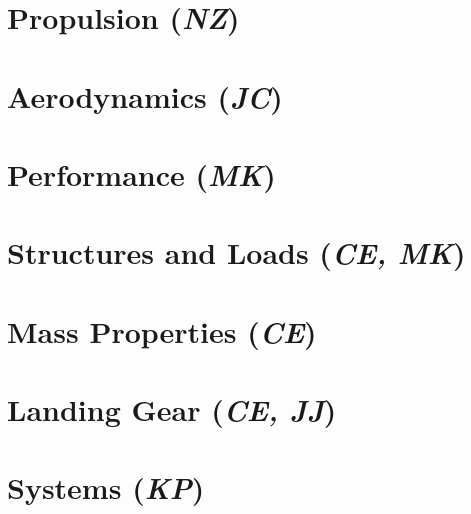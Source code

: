 \documentclass[conf]{new-aiaa}
\begin{document}
\clearpage
\section{Propulsion (\textit{NZ})}
\label{section: Propulsion}


\clearpage
\section{Aerodynamics (\textit{JC})}
\label{section: Aerodynamics}


\section{Performance (\textit{MK})}
\label{section: Performance}


% 

\clearpage
\section{Structures and Loads (\textit{CE, MK})}
\label{section: Structures and Loads}


\clearpage
\section{Mass Properties (\textit{CE})}
\label{section: Mass Properties}


\clearpage
\section{Landing Gear (\textit{CE, JJ})}
\label{section: Landing Gear}


\clearpage
\section{Systems (\textit{KP})}
\label{section: Systems}


% 
\end{document}

